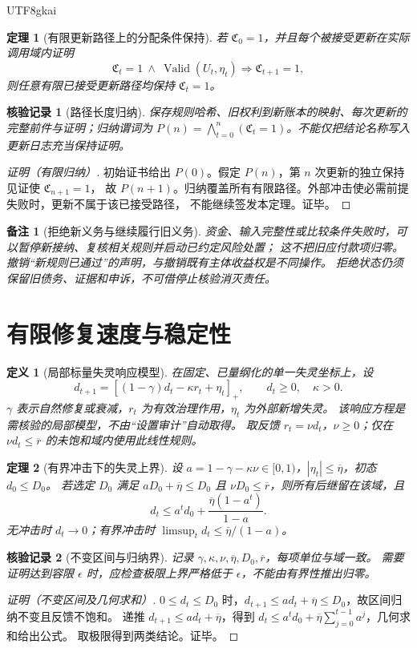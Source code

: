\documentclass[12pt,a4paper,openany]{report}
\newtheorem{definition}{定义}[chapter]
\newtheorem{theorem}{定理}[chapter]
\newtheorem{remark}{备注}[chapter]
\newtheorem{Certificate}{核验记录}[chapter]
\newcommand{\Core}{\mathfrak C}
\begin{document}
\begin{CJK*}{UTF8}{gkai}
\begin{theorem}[有限更新路径上的分配条件保持]
\label{thm:update-invariance}
若 $\Core_0=1$，并且每个被接受更新在实际调用域内证明
\[
 \Core_t=1\ \wedge\ \operatorname{Valid}(U_t,\eta_t)
 \Longrightarrow \Core_{t+1}=1,
\]
则任意有限已接受更新路径均保持 $\Core_t=1$。
\end{theorem}
\begin{Certificate}[路径长度归纳]
保存规则哈希、旧权利到新账本的映射、每次更新的完整前件与证明；归纳谓词为
$P(n)=\bigwedge_{t=0}^n(\Core_t=1)$。不能仅把结论名称写入更新日志充当保持证明。
\end{Certificate}
\begin{proof}[证明（有限归纳）]
初始证书给出 $P(0)$。假定 $P(n)$，第 $n$ 次更新的独立保持见证使 $\Core_{n+1}=1$，
故 $P(n+1)$。归纳覆盖所有有限路径。外部冲击使必需前提失败时，更新不属于该已接受路径，
不能继续签发本定理。证毕。
\end{proof}

\begin{remark}[拒绝新义务与继续履行旧义务]
资金、输入完整性或比较条件失败时，可以暂停新接纳、复核相关规则并启动已约定风险处置；
这不把旧应付款项归零。撤销“新规则已通过”的声明，与撤销既有主体收益权是不同操作。
拒绝状态仍须保留旧债务、证据和申诉，不可借停止核验消灭责任。
\end{remark}

\section{有限修复速度与稳定性}

\begin{definition}[局部标量失灵响应模型]
\label{def:feedback}
在固定、已量纲化的单一失灵坐标上，设
\[
 d_{t+1}=[(1-\gamma)d_t-\kappa r_t+\eta_t]_+,
 \qquad d_t\ge0,\quad\kappa>0.
\]
$\gamma$ 表示自然修复或衰减，$r_t$ 为有效治理作用，$\eta_t$ 为外部新增失灵。
该响应方程是需核验的局部模型，不由“设置审计”自动取得。
取反馈 $r_t=\nu d_t$，$\nu\ge0$；仅在 $\nu d_t\le\overline r$ 的未饱和域内使用此线性规则。
\end{definition}

\begin{theorem}[有界冲击下的失灵上界]
\label{thm:feedback-bound}
设 $a=1-\gamma-\kappa\nu\in[0,1)$，$|\eta_t|\le\overline\eta$，初态 $d_0\le D_0$。
若选定 $D_0$ 满足 $aD_0+\overline\eta\le D_0$ 且 $\nu D_0\le\overline r$，则所有后继留在该域，且
\[
 d_t\le a^td_0+\frac{\overline\eta(1-a^t)}{1-a}.
\]
无冲击时 $d_t\to0$；有界冲击时
$\limsup_td_t\le\overline\eta/(1-a)$。
\end{theorem}
\begin{Certificate}[不变区间与归纳界]
记录 $\gamma,\kappa,\nu,\overline\eta,D_0,\overline r$，每项单位与域一致。
需要证明达到容限 $\epsilon$ 时，应检查极限上界严格低于 $\epsilon$，不能由有界性推出归零。
\end{Certificate}
\begin{proof}[证明（不变区间及几何求和）]
$0\le d_t\le D_0$ 时，$d_{t+1}\le ad_t+\overline\eta\le D_0$，故区间归纳不变且反馈不饱和。
递推 $d_{t+1}\le ad_t+\overline\eta$，得到
$d_t\le a^td_0+\overline\eta\sum_{j=0}^{t-1}a^j$，几何求和给出公式。
取极限得到两类结论。证毕。
\end{proof}


\end{CJK*}
\end{document}
